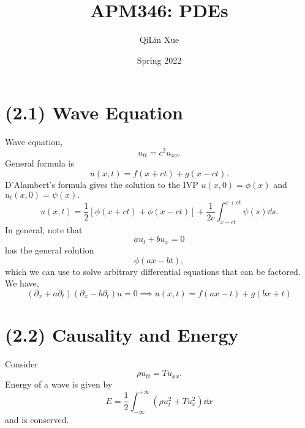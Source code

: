 \documentclass{article}
\title{APM346: PDEs}
\author{QiLin Xue}
\date{Spring 2022}
\numberwithin{equation}{section}
\begin{document}
\maketitle
\tableofcontents
\newpage
\section{(2.1) Wave Equation}
Wave equation,
\begin{equation}
    u_{tt} = c^2u_{xx}.
\end{equation}
General formula is 
\begin{equation}
    u(x,t) = f(x+ct) + g(x-ct).
\end{equation}
D'Alambert's formula gives the solution to the IVP $u(x,0)=\phi(x)$ and $u_t(x,0)=\psi(x).$
\begin{equation}
    u(x,t) = \frac{1}{2}[\phi(x+ct)+\phi(x-ct)] + \frac{1}{2c}\int_{x-ct}^{x+ct} \psi(s) \dd{s}.
\end{equation}
In general, note that 
\begin{equation}
    au_t+bu_x=0
\end{equation}
has the general solution 
\begin{equation}
    \phi\left(ax-bt\right),
\end{equation}
which we can use to solve arbitrary differential equations that can be factored. We have,
\begin{equation}
    (\partial_x+a\partial_t)(\partial_x-b\partial_t)u=0 \implies u(x,t) = f(ax - t) + g(bx + t)
\end{equation}
\section{(2.2) Causality and Energy}
Consider
\begin{equation}
    \rho u_{tt} = Tu_{xx}.
\end{equation}
Energy of a wave is given by 
\begin{equation}
    E = \frac{1}{2}\int_{-\infty}^{+\infty} (\rho u_t^2 + Tu_x^2) \dd{x}
\end{equation}
and is conserved.
\end{document}

